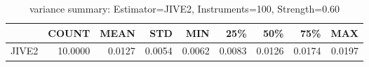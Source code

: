 \begin{table}[ht]
\centering
\caption{variance summary: Estimator=JIVE2, Instruments=100, Strength=0.60}
\begin{tabular}{lrrrrrrrr}
\toprule
 & COUNT & MEAN & STD & MIN & 25\% & 50\% & 75\% & MAX \\
\midrule
JIVE2 & 10.0000 & 0.0127 & 0.0054 & 0.0062 & 0.0083 & 0.0126 & 0.0174 & 0.0197 \\
\bottomrule
\end{tabular}
\end{table}
